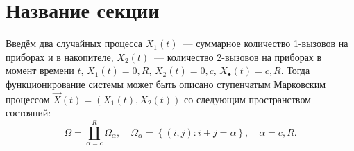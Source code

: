 

\section{Название секции}
\label{chap1:sec3}

Введём два случайных процесса \(X_1 (t)\)~--- суммарное количество 1-вызовов на приборах и в накопителе, \(X_2 (t)\)~--- количество 2-вызовов на приборах в момент времени \(t\), \(X_1 (t) = \overline {0,R} \), \(X_2 (t) = \overline {0,c} \), \(X_\bullet (t) = \overline {c,R} \). Тогда функционирование системы может быть описано ступенчатым Марковским процессом \(\overrightarrow X (t) = (X_1 (t),X_2 (t))\) со следующим пространством состояний:
\begin{equation}
\label{eq:01}
\Omega = \coprod\limits_{\alpha = c}^R \Omega _\alpha , \quad
\Omega _\alpha = \left\{ {(i,j):i + j = \alpha }\right\}, \quad
\alpha = \overline {c,R}.
\end{equation}

